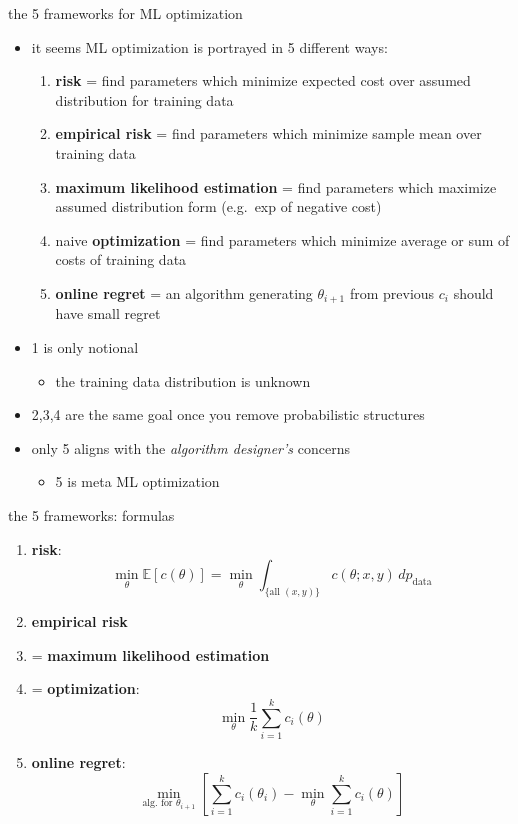 \documentclass[xcolor={svgnames},
               hyperref={colorlinks,citecolor=DeepPink4,linkcolor=FireBrick,urlcolor=Maroon}]
               {beamer}
\newcommand{\EE}{\mathbb{E}}
\begin{document}
\begin{frame}{the 5 frameworks for ML optimization}

\begin{itemize}
\item it seems ML optimization is portrayed in 5 different ways:
    \begin{enumerate}
    \item[1.] \textbf{risk} = find parameters which minimize expected cost over assumed distribution for training data
    \item[2.] \textbf{empirical risk} = find parameters which minimize sample mean over training data
    \item[3.] \textbf{maximum likelihood estimation} = find parameters which maximize assumed distribution form (e.g.~exp of negative cost)
    \item[4.] naive \textbf{optimization} = find parameters which minimize average or sum of costs of training data
    \item[5.] \textbf{online regret} = an algorithm generating $\theta_{i+1}$ from previous $c_i$ should have small regret
    \end{enumerate}

\bigskip
\item 1 is only notional
    \begin{itemize}
    \item[$-$] the training data distribution is unknown
    \end{itemize}
\item 2,3,4 are the same goal once you remove probabilistic structures
\item only 5 aligns with the \emph{algorithm designer's} concerns
    \begin{itemize}
    \item[$-$] 5 is meta ML optimization
    \end{itemize}
\end{itemize}
\end{frame}


\begin{frame}{the 5 frameworks: formulas}

\begin{enumerate}
\item[1.] \textbf{risk}:
    $$\min_\theta \EE[c(\theta)] = \min_\theta \int_{\{\text{all } (x,y)\}} c(\theta;x,y)\,dp_{\text{data}}$$
\item[2.] \textbf{empirical risk}
\item[3.] = \textbf{maximum likelihood estimation}
\item[4.] = \textbf{optimization}:
    $$\min_\theta \frac{1}{k} \sum_{i=1}^k c_i(\theta)$$
\item[5.] \textbf{online regret}:
    $$\min_{\text{alg.~for } \theta_{i+1}} \left[\sum_{i=1}^k c_i(\theta_i) - \min_\theta \sum_{i=1}^k c_i(\theta)\right]$$
\end{enumerate}
\end{frame}
\end{document}
